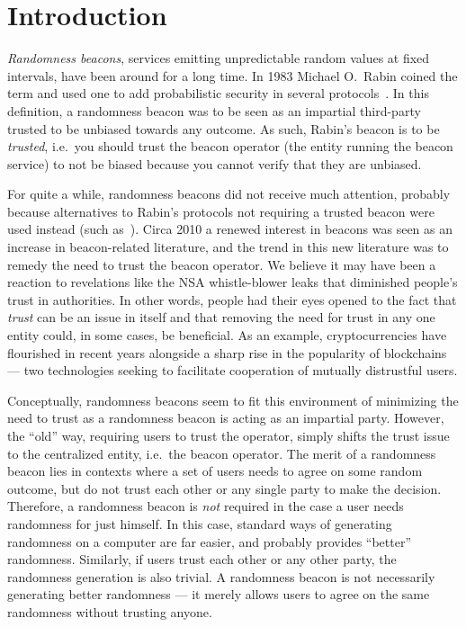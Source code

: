 \section{Introduction}
\emph{Randomness beacons}, services emitting unpredictable random values at fixed intervals, have been around for a long time.
In 1983 Michael O.\ Rabin coined the term and used one to add probabilistic security in several protocols~\cite{rabin1983transaction}.
In this definition, a randomness beacon was to be seen as an impartial third-party trusted to be unbiased towards any outcome.
As such, Rabin's beacon is to be \emph{trusted}, i.e.\ you should trust the beacon operator (the entity running the beacon service) to not be biased because you cannot verify that they are unbiased.

For quite a while, randomness beacons did not receive much attention, probably because alternatives to Rabin's protocols not requiring a trusted beacon were used instead (such as~\cite{BGMR}).
Circa 2010 a renewed interest in beacons was seen as an increase in beacon-related literature, and the trend in this new literature was to remedy the need to trust the beacon operator.
We believe it may have been a reaction to revelations like the NSA whistle-blower leaks that diminished people's trust in authorities.
In other words, people had their eyes opened to the fact that \emph{trust} can be an issue in itself and that removing the need for trust in any one entity could, in some cases, be beneficial.
As an example, cryptocurrencies have flourished in recent years alongside a sharp rise in the popularity of blockchains --- two technologies seeking to facilitate cooperation of mutually distrustful users.

Conceptually, randomness beacons seem to fit this environment of minimizing the need to trust as a randomness beacon is acting as an impartial party.
However, the \enquote{old} way, requiring users to trust the operator, simply shifts the trust issue to the centralized entity, i.e.\ the beacon operator.
The merit of a randomness beacon lies in contexts where a set of users needs to agree on some random outcome, but do not trust each other or any single party to make the decision.
Therefore, a randomness beacon is \emph{not} required in the case a user needs randomness for just himself. In this case, standard ways of generating randomness on a computer are far easier, and probably provides \enquote{better} randomness.
Similarly, if users trust each other or any other party, the randomness generation is also trivial.
A randomness beacon is not necessarily generating better randomness --- it merely allows users to agree on the same randomness without trusting anyone.

